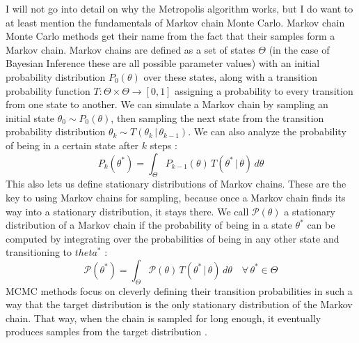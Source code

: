 \documentclass[12pt, a4paper]{report}
\begin{document}
I will not go into detail on why the Metropolis algorithm works, but I do want to at least mention the fundamentals of Markov chain Monte Carlo.
Markov chain Monte Carlo methods get their name from the fact that their samples form a Markov chain.
Markov chains are defined as a set of states $\Theta$ (in the case of Bayesian Inference these are all possible parameter values) with an initial probability distribution $P_0(\theta)$ over these states, along with a transition probability function $T: \Theta \times \Theta \rightarrow [0,1]$ assigning a probability to every transition from one state to another.
We can simulate a Markov chain by sampling an initial state $\theta_0 \sim P_0(\theta)$, then sampling the next state from the transition probability distribution $\theta_k \sim T(\theta_k \,|\, \theta_{k-1})$.
We can also analyze the probability of being in a certain state after $k$ steps \cite[372]{mckay}: 
$$
    P_k(\theta^*) = \int_{\Theta} P_{k-1}(\theta) \, T(\theta^* \,|\, \theta) \, d\theta 
$$
This also lets us define stationary distributions of Markov chains.
These are the key to using Markov chains for sampling, because once a Markov chain finds its way into a stationary distribution, it stays there.
We call $\mathcal{P}(\theta)$ a stationary distribution of a Markov chain if the probability of being in a state $\theta^*$ can be computed by integrating over the probabilities of being in any other state and transitioning to $theta^*$ \cite[372]{mckay}:
$$
    \mathcal{P}(\theta^*) = \int_{\Theta} \mathcal{P}(\theta) \, T(\theta^* \,|\, \theta) \, d\theta \quad \forall \, \theta^* \in \Theta
$$
MCMC methods focus on cleverly defining their transition probabilities in such a way that the target distribution is the only stationary distribution of the Markov chain.
That way, when the chain is sampled for long enough, it eventually produces samples from the target distribution \cite[372]{mckay}.
\end{document}
